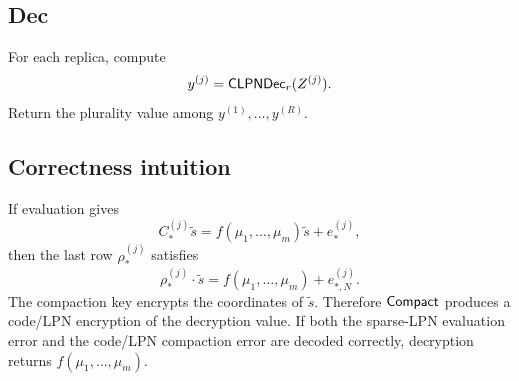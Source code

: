 \subsection{Dec}

For each replica, compute
\[
    y^{(j)}=\mathsf{CLPN}\mathsf{Dec}_r(Z^{(j)}).
\]
Return the plurality value among $y^{(1)},\ldots,y^{(R)}$.

\subsection{Correctness intuition}

If evaluation gives
\[
    C_*^{(j)}\tilde{s}=f(\mu_1,\ldots,\mu_m)\tilde{s}+e_*^{(j)},
\]
then the last row $\rho_*^{(j)}$ satisfies
\[
    \rho_*^{(j)}\cdot\tilde{s}=f(\mu_1,\ldots,\mu_m)+e_{*,N}^{(j)}.
\]
The compaction key encrypts the coordinates of $\tilde{s}$.  Therefore $\mathsf{Compact}$ produces a code/LPN encryption of the decryption value.  If both the sparse-LPN evaluation error and the code/LPN compaction error are decoded correctly, decryption returns $f(\mu_1,\ldots,\mu_m)$.
